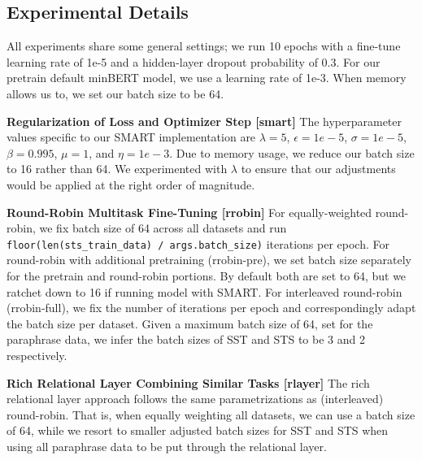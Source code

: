 \documentclass{article}
\begin{document}
\subsection{Experimental Details} 
All experiments share some general settings; we run 10 epochs with a fine-tune learning rate of 1e-5 and a hidden-layer dropout probability of 0.3. For our pretrain default minBERT model, we use a learning rate of 1e-3. When memory allows us to, we set our batch size to be 64.

\textbf{Regularization of Loss and Optimizer Step [smart]} The hyperparameter values specific to our SMART \cite{smart} implementation are $\lambda = 5$, $\epsilon = 1e-5$, $\sigma = 1e-5$, $\beta = 0.995$, $\mu = 1$, and $\eta = 1e-3$. Due to memory usage, we reduce our batch size to 16 rather than 64. We experimented with $\lambda$ to ensure that our adjustments would be applied at the right order of magnitude.

\textbf{Round-Robin Multitask Fine-Tuning [rrobin]} For equally-weighted round-robin, we fix batch size of 64 across all datasets and run \texttt{floor(len(sts\_train\_data) / args.batch\_size)} iterations per epoch. For round-robin with additional pretraining (rrobin-pre), we set batch size separately for the pretrain and round-robin portions. By default both are set to 64, but we ratchet down to 16 if running model with SMART. For interleaved round-robin (rrobin-full), we fix the number of iterations per epoch and correspondingly adapt the batch size per dataset. Given a maximum batch size of 64, set for the paraphrase data, we infer the batch sizes of SST and STS to be 3 and 2 respectively.

\textbf{Rich Relational Layer Combining Similar Tasks [rlayer]} The rich relational layer approach follows the same parametrizations as (interleaved) round-robin. That is, when equally weighting all datasets, we can use a batch size of 64, while we resort to smaller adjusted batch sizes for SST and STS when using all paraphrase data to be put through the relational layer.

\end{document}
